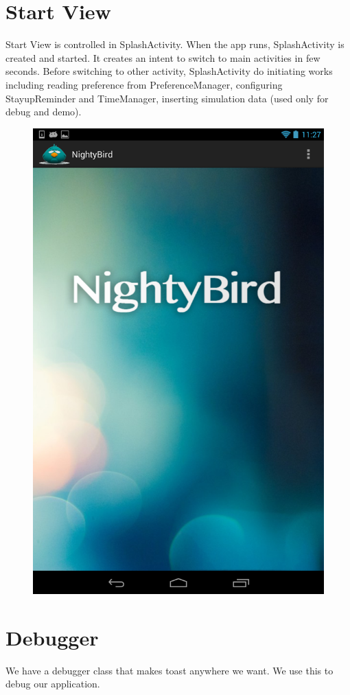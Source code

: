 \documentclass[14pt]{extreport}
\begin{document}
\section{Start View}
Start View is controlled in SplashActivity. When the app runs, SplashActivity is created and started. It creates an intent to switch to main activities in few seconds. Before switching to other activity, SplashActivity do initiating works including reading preference from PreferenceManager, configuring StayupReminder and TimeManager, inserting simulation data (used only for debug and demo). 
\begin{figure}[h]
\begin{center}
\includegraphics[width=5in]{starview}
\end{center}
\end{figure}

\section{Debugger}
We have a debugger class that makes toast anywhere we want. We use this to debug our application.
\end{document}

